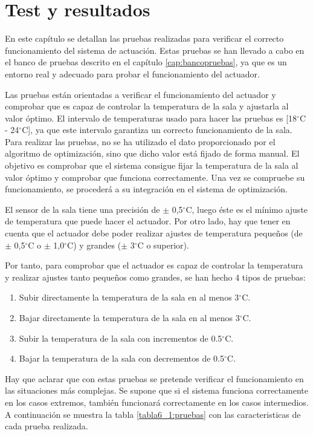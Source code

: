 \chapter{Test y resultados}\label{cap:test}

	En este capítulo se detallan las pruebas realizadas para verificar el correcto funcionamiento del sistema de actuación. Estas pruebas se han llevado a cabo en el banco de pruebas descrito en el capítulo \ref{cap:bancopruebas}, ya que es un entorno real y adecuado para probar el funcionamiento del actuador.

	Las pruebas están orientadas a verificar el funcionamiento del actuador y comprobar que es capaz de controlar la temperatura de la sala y ajustarla al valor óptimo. El intervalo de temperaturas usado para hacer las pruebas es [18{$^\circ$}C - 24{$^\circ$}C], ya que este intervalo garantiza un correcto funcionamiento de la sala. Para realizar las pruebas, no se ha utilizado el dato proporcionado por el algoritmo de optimización, sino que dicho valor está fijado de forma manual. El objetivo es comprobar que el sistema consigue fijar la temperatura de la sala al valor óptimo y comprobar que funciona correctamente. Una vez se compruebe su funcionamiento, se procederá a su integración en el sistema de optimización. 

	El sensor de la sala tiene una precisión de $\pm$ 0,5{$^\circ$}C, luego éste es el mínimo ajuste de temperatura que puede hacer el actuador. Por otro lado, hay que tener en cuenta que el actuador debe poder realizar ajustes de temperatura  pequeños  (de $\pm$ 0,5{$^\circ$}C o $\pm$ 1,0{$^\circ$}C) y grandes ($\pm$ 3{$^\circ$}C o superior). 

	Por tanto, para comprobar que el actuador es capaz de controlar la temperatura y realizar ajustes tanto pequeños como grandes, se han hecho 4 tipos de pruebas:

\begin{enumerate}
	\item Subir directamente la temperatura de la sala en al menos 3{$^\circ$}C.
           \item Bajar directamente la temperatura de la sala en al menos 3{$^\circ$}C.
           \item Subir la temperatura de la sala con incrementos de 0.5{$^\circ$}C.
           \item Bajar la temperatura de la sala con decrementos de 0.5{$^\circ$}C.
\end{enumerate} 

	Hay que aclarar que con estas pruebas se pretende verificar el funcionamiento en las situaciones más complejas. Se supone que si el sistema funciona correctamente en los casos extremos, también funcionará correctamente en los casos intermedios. A continuación se muestra la tabla \ref{tabla6_1:pruebas} con las caracteristicas de cada prueba realizada. 

